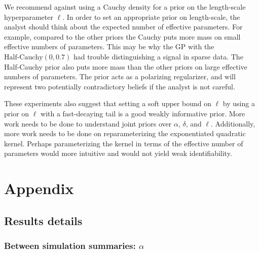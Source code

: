 \documentclass{article}
\begin{document}
We recommend against using a Cauchy density for a prior on the length-scale
hyperparameter $\ell$. In order to set an appropriate prior on length-scale,
the analyst should think about the expected number of effective parameters.
For example, compared to the other priors the Cauchy puts more mass on small
effective numbers of parameters. This may be why the GP with the
$\text{Half-Cauchy}(0, 0.7)$ had trouble distinguishing a signal in sparse
data. The Half-Cauchy prior also puts more mass than the other priors on large
effective numbers of parameters. The prior acts as a polarizing regularizer,
and will represent two potentially contradictory beliefs if the analyst is not
careful.

These experiments also suggest that setting a soft upper bound on $\ell$ by
using a prior on $\ell$ with a fast-decaying tail is a good weakly informative
prior.  More work needs to be done to understand joint priors over $\alpha$,
$\delta$, and $\ell$. Additionally, more work needs to be done on
reparameterizing the exponentiated quadratic kernel. Perhaps parameterizing the
kernel in terms of the effective number of parameters would more intuitive and
would not yield weak identifiability.

\pagebreak

\section{Appendix}

\subsection{Results details}

\subsubsection{Between simulation summaries: $\alpha$}
\end{document}
